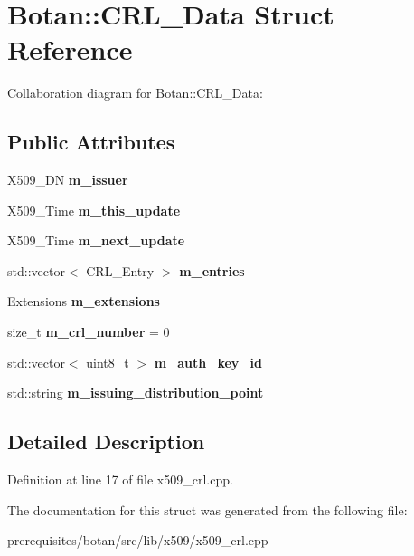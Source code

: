 \hypertarget{struct_botan_1_1_c_r_l___data}{}\section{Botan\+:\+:C\+R\+L\+\_\+\+Data Struct Reference}
\label{struct_botan_1_1_c_r_l___data}


Collaboration diagram for Botan\+:\+:C\+R\+L\+\_\+\+Data\+:
\subsection*{Public Attributes}
\begin{DoxyCompactItemize}
\item 
\mbox{\label{struct_botan_1_1_c_r_l___data_acb2f0e498f5ab2480a7c94b0a5953827}} 
X509\+\_\+\+DN {\bfseries m\+\_\+issuer}
\item 
\mbox{\label{struct_botan_1_1_c_r_l___data_a420ce6ce9f4c8f3349506bf3c150814b}} 
X509\+\_\+\+Time {\bfseries m\+\_\+this\+\_\+update}
\item 
\mbox{\label{struct_botan_1_1_c_r_l___data_aaaf1358cf0e103a329f45c371039c7f6}} 
X509\+\_\+\+Time {\bfseries m\+\_\+next\+\_\+update}
\item 
\mbox{\label{struct_botan_1_1_c_r_l___data_ac425a6a0852e0d386658c03c1e1bc898}} 
std\+::vector$<$ C\+R\+L\+\_\+\+Entry $>$ {\bfseries m\+\_\+entries}
\item 
\mbox{\label{struct_botan_1_1_c_r_l___data_a74976fb07b1c651cef4281be4ad49085}} 
Extensions {\bfseries m\+\_\+extensions}
\item 
\mbox{\label{struct_botan_1_1_c_r_l___data_a62a341978a1005e96f8e82e871a81d8d}} 
size\+\_\+t {\bfseries m\+\_\+crl\+\_\+number} = 0
\item 
\mbox{\label{struct_botan_1_1_c_r_l___data_a7731b89202f50c6b0dfdfa9e7f8c7713}} 
std\+::vector$<$ uint8\+\_\+t $>$ {\bfseries m\+\_\+auth\+\_\+key\+\_\+id}
\item 
\mbox{\label{struct_botan_1_1_c_r_l___data_a6235d58529ce7c7b8bf2d2cf3e9e0ca3}} 
std\+::string {\bfseries m\+\_\+issuing\+\_\+distribution\+\_\+point}
\end{DoxyCompactItemize}


\subsection{Detailed Description}


Definition at line 17 of file x509\+\_\+crl.\+cpp.



The documentation for this struct was generated from the following file\+:\begin{DoxyCompactItemize}
\item 
prerequisites/botan/src/lib/x509/x509\+\_\+crl.\+cpp\end{DoxyCompactItemize}
